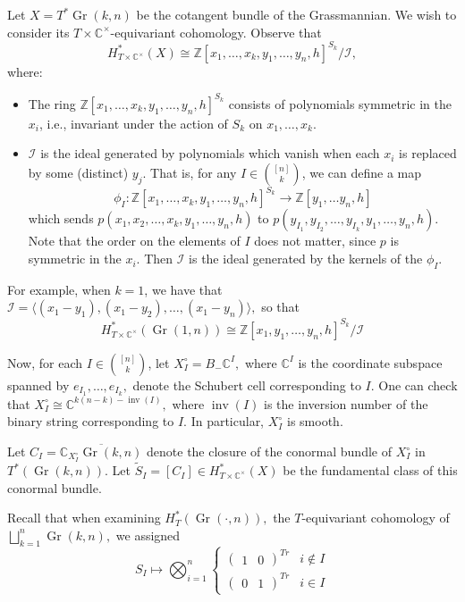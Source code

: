 \documentclass[12pt]{amsart}
\numberwithin{equation}{section}
\theoremstyle{definition}
\numberwithin{figure}{section}
\newcommand{\C}{\mathbb{C}}
\newcommand{\Z}{\mathbb{Z}}
\newcommand{\on}[1]{\operatorname{#1}}
\newcommand{\cI}{\mathcal{I}}
\newcommand{\Gr}{\on{Gr}}
\newcommand{\Stil}{\tilde{S}}
\begin{document}
Let $X = T^*\Gr(k, n)$ be the cotangent bundle of the Grassmannian. We wish to consider its $T \times \C^\times$-equivariant cohomology. Observe that
\[H_{T \times \C^\times}^*(X) \cong \Z[x_1, \ldots, x_k, y_1, \ldots, y_n, h]^{S_k}/\cI,\]
where:

\begin{itemize}
	\item The ring $\Z[x_1, \ldots, x_k, y_1, \ldots, y_n, h]^{S_k}$ consists of polynomials symmetric in the $x_i$, i.e., invariant under the action of $S_k$ on $x_1, \ldots, x_k$. \item $\cI$ is the ideal generated by polynomials which vanish when each $x_i$ is replaced by some (distinct) $y_j$. 
	That is, for any $I \in \binom{[n]}{k}$, we can define a map 
	\[\phi_I: \Z[x_1, \ldots, x_k, y_1, \ldots, y_n, h]^{S_k} \rightarrow \Z[y_1, \ldots y_n, h]\] 
	which sends $p(x_1, x_2, \ldots, x_k, y_1, \ldots, y_n, h)$ to $p(y_{I_1}, y_{I_2}, \ldots, y_{I_k}, y_1, \ldots, y_n, h).$ Note that the order on the elements of $I$ does not matter, since $p$ is symmetric in the $x_i.$ Then $\cI$ is the ideal generated by the kernels of the $\phi_I.$
\end{itemize}
For example, when $k=1$, we have that $\cI = \langle (x_1 - y_1), (x_1-y_2), \ldots, (x_1-y_n) \rangle,$ so that
\[H_{T \times \C^\times}^*(\Gr(1,n)) \cong \Z[x_1, y_1, \ldots, y_n, h]^{S_k}/\cI\]

Now, for each $I \in \binom{[n]}{k}$, let $X_I^\circ = B_{-}\C^I,$ where $\C^I$ is the coordinate subspace spanned by $e_{I_1}, \ldots, e_{I_k},$ denote the Schubert cell corresponding to $I$. One can check that $X_I^\circ  \cong \C^{k(n-k)-\on{inv}(I)},$ where $\on{inv}(I)$ is the inversion number of the binary string corresponding to $I$. In particular, $X_I^\circ$ is smooth.

Let $C_I = \overline{\C_{X_I^\circ} \Gr(k, n)}$ denote the closure of the conormal bundle of $X_I^\circ$ in $T^*(\Gr(k,n)).$ Let $\Stil_I = [C_I] \in H_{T \times \C^\times}^*(X)$ be the fundamental class of this conormal bundle.

Recall that when examining $H_T^*(\Gr(\cdot, n)),$ the $T$-equivariant cohomology of $\bigsqcup_{k=1}^n \Gr(k,n),$ we assigned 
\[S_I \mapsto \bigotimes_{i=1}^n \begin{cases}
	\begin{pmatrix}
		1 & 0
	\end{pmatrix}^{Tr} & i \not \in I\\
	\begin{pmatrix}
		0 & 1
	\end{pmatrix}^{Tr} & i \in I
\end{cases}\]
\end{document}
